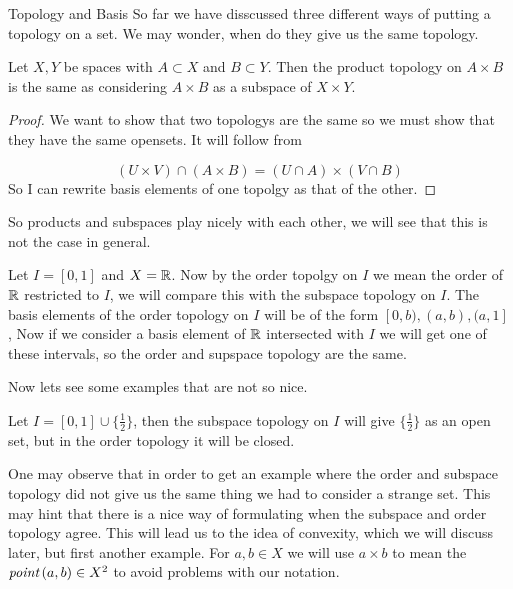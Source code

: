 \begin{chapter}{Topology and Basis}
   So far we have disscussed three different ways of putting a topology on a set. We may wonder, when do they give us the same topology. 


   \begin{thm}
    Let $X, Y$ be spaces with $A \subset X$ and $B \subset Y$. Then the product topology on $A \times B$ is the same as 
    considering $A \times B$ as a subspace of $X \times Y$. 
    \end{thm}

    \begin{proof}
        We want to show that two topologys are the same so we must show that they have the same opensets. It will follow from 

        \[(U \times V ) \cap (A \times B) = (U \cap A) \times (V \cap B)\]
        So I can rewrite basis elements of one topolgy as that of the other. 
    \end{proof}

    So products and subspaces play nicely with each other, we will see that this is not the case in general. 

   \begin{ex}
    Let $I = [0,1]$ and $X  = \mathbb{R}$. Now by the order topolgy on $I$ we mean the order of  $\mathbb{R}$ restricted to $I$, we will compare this with the subspace topology on $I$. 
    The basis elements of the order topology on $I$ will be of the form $[0, b), (a, b), (a, 1]$, Now if we consider a basis element of $\mathbb{R}$ intersected with $I$ we will get one 
    of these intervals, so the order and supspace topology are the same.  
   \end{ex}

   Now lets see some examples that are not so nice. 


   \begin{ex}
    Let $I = [0, 1] \cup \{\frac{1}{2}\}$, then the subspace topology on $I$ will give $\{\frac{1}{2}\}$ as an open set, but in the order topology it will be closed. 
   \end{ex}

   One may observe that in order to get an example where the order and subspace topology did not give us the same thing we had to consider a strange set. This may hint that there is a nice 
   way of formulating when the subspace and order topology agree. This will lead us to the idea of convexity, which we will discuss later, but first another example. For $a, b \in X$ we will 
   use $a \times b$ to mean the $\emph{point} \, (a, b) \in X^2$ to avoid problems with our notation.  


\end{chapter}
